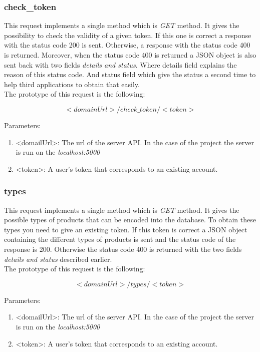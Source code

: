 \subsubsection{check\_token}
This request implements a single method which is \textit{GET} method. It gives the possibility to check the validity of a given token. If this one is correct a response with the status code 200 is sent. Otherwise, a response with the status code 400 is returned. Moreover, when the status code 400 is returned a JSON object is also sent back with two fields \textit{details and status}. Where details field explains the reason of this status code. And status field which give the status a second time to help third applications to obtain that easily. \\

The prototype of this request is the following:

$$<domainUrl>/check\_token/<token>$$

Parameters:
\begin{enumerate}
\item <domailUrl>: The url of the server API. In the case of the project the server is run on the \textit{localhost:5000}
\item <token>: A user's token that corresponds to an existing account.
\end{enumerate}

\subsubsection{types}
This request implements a single method which is \textit{GET} method. It gives the possible types of products that can be encoded into the database. To obtain these types you need to give an existing token. If this token is correct a JSON object containing the different types of products is sent and the status code of the response is 200. Otherwise the status code 400 is returned with the two fields \textit{details and status} described earlier.\\

The prototype of this request is the following:

$$<domainUrl>/types/<token>$$

Parameters:
\begin{enumerate}
\item <domailUrl>: The url of the server API. In the case of the project the server is run on the \textit{localhost:5000}
\item <token>: A user's token that corresponds to an existing account.
\end{enumerate}

